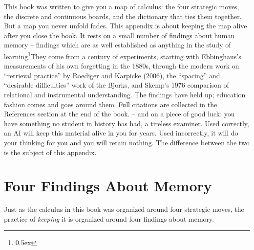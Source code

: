 %
%

This book was written to give you a map of calculus: the four strategic
moves, the discrete and continuous boards, and the dictionary that ties
them together. But a map you never unfold fades. This appendix is about
keeping the map alive after you close the book. It rests on a small
number of findings about human memory -- findings which are as well
established as anything in the study of learning\footnote{\kern 0.5pt
\raise 0.5ex \hbox{\dag}}{They come from a century of experiments,
starting with Ebbinghaus's measurements of his own forgetting in the
1880s, through the modern work on ``retrieval practice'' by Roediger and
Karpicke (2006), the ``spacing'' and ``desirable difficulties'' work of
the Bjorks, and Skemp's 1976 comparison of relational and instrumental
understanding. The findings have held up; education fashion comes and
goes around them. Full citations are collected in the References section
at the end of the book.} -- and on a piece of good luck: you have something no
student in history has had, a tireless examiner. Used correctly, an AI
will keep this material alive in you for years. Used incorrectly, it
will do your thinking for you and you will retain nothing. The
difference between the two is the subject of this appendix.

\section{Four Findings About Memory}
Just as the calculus in this book was organized around four strategic
moves, the practice of {\it keeping\/} it is organized around four
findings about memory.

\beginEnum
{}
\endEnum

